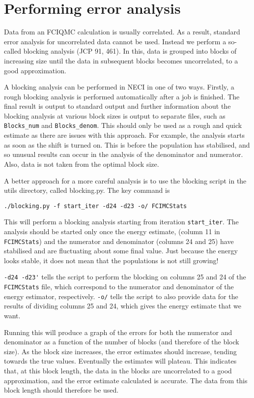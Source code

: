 \documentclass[a4paper,notitlepage]{scrreprt}
\let\code\lstinline
\begin{document}
\section{Performing error analysis}
    Data from an FCIQMC calculation is usually correlated. As a result,
    standard error analysis for uncorrelated data cannot be used. Instead we
    perform a so-called blocking analysis (JCP 91, 461). In this, data is
    grouped into blocks of increasing size until the data in subsequent blocks
    becomes uncorrelated, to a good approximation.

    A blocking analysis can be performed in NECI in one of two ways. Firstly,
    a rough blocking analysis is performed automatically after a job is finished.
    The final result is output to standard output and further information about
    the blocking analysis at various block sizes is output to separate files,
	such as \code{Blocks_num} and \code{Blocks_denom}. This should only be
	used as a rough
    and quick estimate as there are issues with this approach. For example, the
    analysis starts as soon as the shift is turned on. This is before the
    population has stabilised, and so unusual results can occur in the analysis
    of the denominator and numerator. Also, data is not taken from the optimal
    block size.

    A better approach for a more careful analysis is to use the blocking script
    in the utils directory, called blocking.py. The key command is
	\begin{lstlisting}[gobble=4]
		./blocking.py -f start_iter -d24 -d23 -o/ FCIMCStats
    \end{lstlisting}

	This will perform a blocking analysis starting from iteration
	\code{start_iter}.
    The analysis should be started only once the energy estimate, (column 11 in
	\code{FCIMCStats}) and the numerator and denominator (columns 24 and
	25) have
    stabilised and are fluctuating about some final value. Just because the
    energy looks stable, it does not mean that the populations is not still
    growing!

	\code{-d24 -d23'} tells the script to perform the blocking on columns 25 and
	24 of the \code{FCIMCStats} file, which correspond to the numerator and
	denominator of the energy estimator, respectively. \code{-o/} tells the script
    to also provide data for the results of dividing columns 25 and 24, which
    gives the energy estimate that we want.

    Running this will produce a graph of the errors for both the numerator and
    denominator as a function of the number of blocks (and therefore of the
    block size). As the block size increases, the error estimates should
    increase, tending towards the true values. Eventually the estimates will
    plateau. This indicates that, at this block length, the data in the blocks
    are uncorrelated to a good approximation, and the error estimate calculated
    is accurate. The data from this block length should therefore be used.
\end{document}
